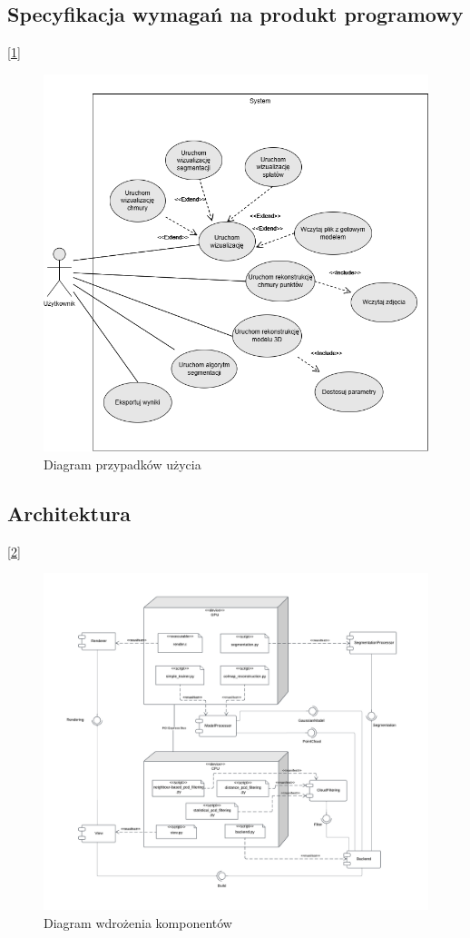 \subsection{Specyfikacja wymagań na produkt programowy} [\ref{fig:use_case_diagram}]

\begin{figure}[!htb]
    \includegraphics[width=1.0\linewidth]{img/diagramy/zpi use case.png}
    \caption{Diagram przypadków użycia}\label{fig:use_case_diagram}
  \end{figure}

\subsection{Architektura} [\ref{fig:components_diagram}]

\begin{figure}[!htb]
    \includegraphics[width=1.0\linewidth]{img/diagramy/diagram_wdrozenia_komponentow_3.png}
    \caption{Diagram wdrożenia komponentów}\label{fig:components_diagram}
\end{figure}
